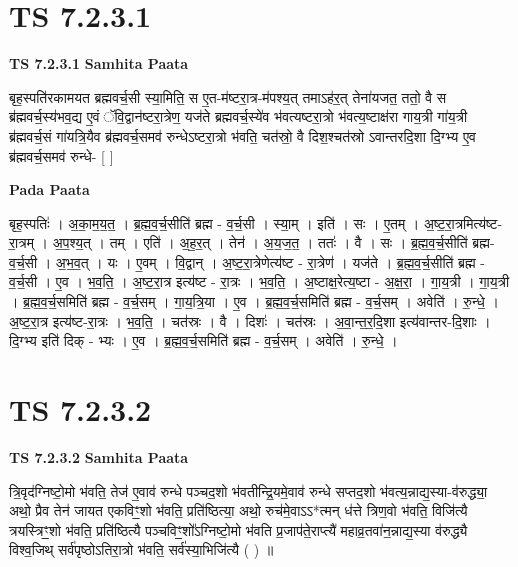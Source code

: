 \documentclass[17pt]{extarticle}
\begin{document}

\section{ TS 7.2.3.1 }

\textbf{TS 7.2.3.1 } \newline
\textbf{Samhita Paata} \newline

बृह॒स्पति॑रकामयत ब्रह्मवर्च॒सी स्या॒मिति॒ स ए॒त-म॑ष्टरा॒त्र-म॑पश्य॒त् तमाऽह॑र॒त् तेना॑यजत॒ ततो॒ वै स ब्र॑ह्मवर्च॒स्य॑भव॒द्य ए॒वं ॅवि॒द्वान॑ष्टरा॒त्रेण॒ यज॑ते ब्रह्मवर्च॒स्ये॑व भ॑वत्यष्टरा॒त्रो भ॑वत्य॒ष्टाक्ष॑रा गाय॒त्री गा॑य॒त्री ब्र॑ह्मवर्च॒सं गा॑यत्रि॒यैव ब्र॑ह्मवर्च॒समव॑ रुन्धेऽष्टरा॒त्रो भ॑वति॒ चत॑स्रो॒ वै दिश॒श्चत॑स्रो ऽवान्तरदि॒शा दि॒ग्भ्य ए॒व ब्र॑ह्मवर्च॒समव॑ रुन्धे- [  ] \newline

\textbf{Pada Paata} \newline

बृह॒स्पतिः॑ । अ॒का॒म॒य॒त॒ । ब्र॒ह्म॒व॒र्च॒सीति॑ ब्रह्म - व॒र्च॒सी । स्या॒म् । इति॑ । सः । ए॒तम् । अ॒ष्ट॒रा॒त्रमित्य॑ष्ट-रा॒त्रम् । अ॒प॒श्य॒त् । तम् । एति॑ । अ॒ह॒र॒त् । तेन॑ । अ॒य॒ज॒त॒ । ततः॑ । वै । सः । ब्र॒ह्म॒व॒र्च॒सीति॑ ब्रह्म-व॒र्च॒सी । अ॒भ॒व॒त् । यः । ए॒वम् । वि॒द्वान् । अ॒ष्ट॒रा॒त्रेणेत्य॑ष्ट - रा॒त्रेण॑ । यज॑ते । ब्र॒ह्म॒व॒र्च॒सीति॑ ब्रह्म - व॒र्च॒सी । ए॒व । भ॒व॒ति॒ । अ॒ष्ट॒रा॒त्र इत्य॑ष्ट - रा॒त्रः । भ॒व॒ति॒ । अ॒ष्टाक्ष॒रेत्य॒ष्टा - अ॒क्ष॒रा॒ । गा॒य॒त्री । गा॒य॒त्री । ब्र॒ह्म॒व॒र्च॒समिति॑ ब्रह्म - व॒र्च॒सम् । गा॒य॒त्रि॒या । ए॒व । ब्र॒ह्म॒व॒र्च॒समिति॑ ब्रह्म - व॒र्च॒सम् । अवेति॑ । रु॒न्धे॒ । अ॒ष्ट॒रा॒त्र इत्य॑ष्ट-रा॒त्रः । भ॒व॒ति॒ । चत॑स्रः । वै । दिशः॑ । चत॑स्रः । अ॒वा॒न्त॒र॒दि॒शा इत्य॑वान्तर-दि॒शाः । दि॒ग्भ्य इति॑ दिक् - भ्यः । ए॒व । ब्र॒ह्म॒व॒र्च॒समिति॑ ब्रह्म - व॒र्च॒सम् । अवेति॑ । रु॒न्धे॒ ।  \newline





\section{ TS 7.2.3.2 }

\textbf{TS 7.2.3.2 } \newline
\textbf{Samhita Paata} \newline

त्रि॒वृद॑ग्निष्टो॒मो भ॑वति॒ तेज॑ ए॒वाव॑ रुन्धे पञ्चद॒शो भ॑वतीन्द्रि॒यमे॒वाव॑ रुन्धे सप्तद॒शो भ॑वत्य॒न्नाद्य॒स्या-व॑रुद्ध्या॒ अथो॒ प्रैव तेन॑ जायत एकविꣳ॒॒शो भ॑वति॒ प्रति॑ष्ठित्या॒ अथो॒ रुच॑मे॒वाऽऽ*त्मन् ध॑त्ते त्रिण॒वो भ॑वति॒ विजि॑त्यै त्रयस्त्रिꣳ॒॒शो भ॑वति॒ प्रति॑ष्ठित्यै पञ्चविꣳ॒॒शो᳚ऽग्निष्टो॒मो भ॑वति प्र॒जाप॑ते॒राप्त्यै॑ महाव्र॒तवा॑न॒न्नाद्य॒स्या व॑रुद्ध्यै विश्व॒जिथ् सर्व॑पृष्ठोऽतिरा॒त्रो भ॑वति॒ सर्व॑स्या॒भिजि॑त्यै ( ) ॥ \newline
\end{document}
